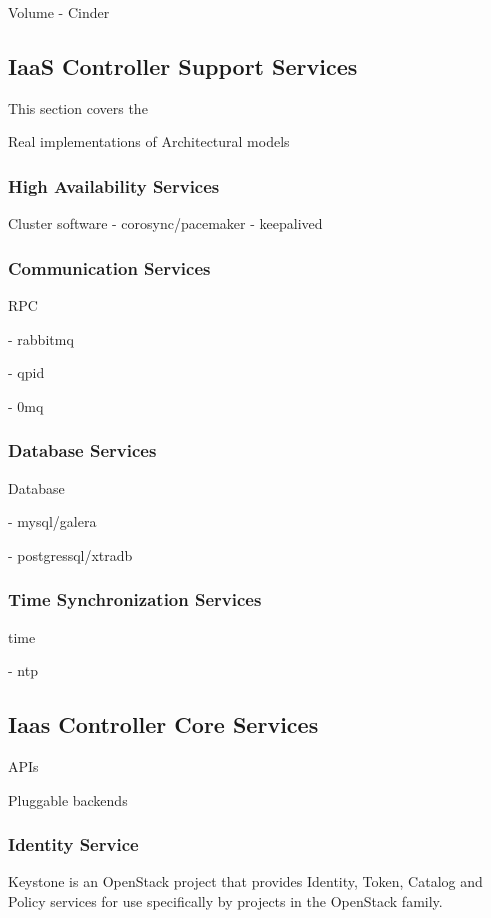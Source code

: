 Volume - Cinder

\subsection{IaaS Controller Support Services}

This section covers the 

Real implementations of Architectural models

\subsubsection{High Availability Services}

Cluster software
- corosync/pacemaker
- keepalived

\subsubsection{Communication Services}

RPC

- rabbitmq

- qpid

- 0mq

\subsubsection{Database Services}

Database

- mysql/galera

- postgressql/xtradb

\subsubsection{Time Synchronization Services}

time

- ntp

\subsection{Iaas Controller Core Services}

APIs

Pluggable backends

\subsubsection{Identity Service}

Keystone is an OpenStack project that provides Identity, Token, Catalog and Policy services for use specifically by projects in the OpenStack family.

